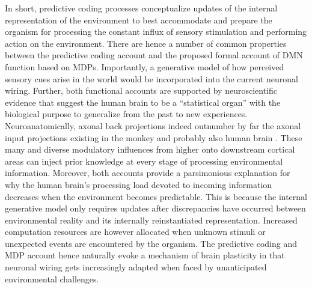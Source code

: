 \documentclass[10pt,letterpaper]{article}
\begin{document}
In short, predictive coding processes
conceptualize updates of the internal representation of the environment
to best accommodate and prepare the organism
for processing the constant influx of sensory stimulation and
performing action on the environment.
There are hence a number of common properties
between the predictive coding account
and the proposed formal account of DMN function based on MDPs.
Importantly,
a generative model of how perceived sensory cues arise in the
world would be incorporated into
the current neuronal wiring.
Further,
both functional accounts are supported by
neuroscientific evidence that suggest
the human brain to be a ``statistical organ'' \citep{friston2014phantastic}
with the biological purpose to
generalize from the past to new experiences.
Neuroanatomically, axonal
back projections indeed outnumber by far the axonal input projections
existing in the monkey and probably also human brain
\citep{salin1995corticocortical}.
These many and diverse modulatory influences
from higher onto downstream cortical areas
can inject prior knowledge
at every stage of processing environmental information.
%
Moreover,
both accounts provide a parsimonious explanation for why the
human brain's processing load devoted to incoming information decreases
when the environment becomes predictable.
This is because the internal generative
model only requires updates after discrepancies have occurred between
environmental reality and its internally reinstantiated representation.
Increased computation resources are however allocated
when unknown stimuli or
unexpected events are encountered by the organism.
The predictive coding and MDP account hence
naturally evoke a mechanism of brain plasticity in that
neuronal wiring gets increasingly adapted
when faced by unanticipated environmental challenges.
\end{document}
